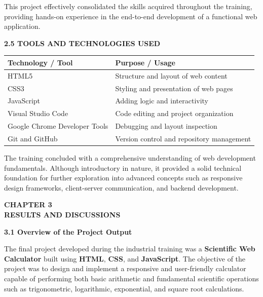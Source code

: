 \documentclass[a4paper,12pt,oneside]{report}
\numberwithin{equation}{chapter}
\numberwithin{figure}{chapter}
\numberwithin{table}{chapter}
\begin{document}
This project effectively consolidated the skills acquired throughout the training, providing hands-on experience in the end-to-end development of a functional web application.

\vspace{5mm}
\noindent
\textbf{2.5 TOOLS AND TECHNOLOGIES USED}

\begin{center}
\begin{tabular}{|p{5cm}|p{8cm}|}
\hline
\textbf{Technology / Tool} & \textbf{Purpose / Usage} \\
\hline
HTML5 & Structure and layout of web content \\
\hline
CSS3 & Styling and presentation of web pages \\
\hline
JavaScript & Adding logic and interactivity \\
\hline
Visual Studio Code & Code editing and project organization \\
\hline
Google Chrome Developer Tools & Debugging and layout inspection \\
\hline
Git and GitHub & Version control and repository management \\
\hline
\end{tabular}
\end{center}

\vspace{3mm}
The training concluded with a comprehensive understanding of web development fundamentals. Although introductory in nature, it provided a solid technical foundation for further exploration into advanced concepts such as responsive design frameworks, client-server communication, and backend development.


\newpage
\begin{center}
    \Large\textbf{CHAPTER 3}\\[2mm]
    \large\textbf{RESULTS AND DISCUSSIONS}
\end{center}

\noindent
\textbf{3.1 Overview of the Project Output}

The final project developed during the industrial training was a \textbf{Scientific Web Calculator} built using \textbf{HTML}, \textbf{CSS}, and \textbf{JavaScript}. The objective of the project was to design and implement a responsive and user-friendly calculator capable of performing both basic arithmetic and fundamental scientific operations such as trigonometric, logarithmic, exponential, and square root calculations.
\end{document}
